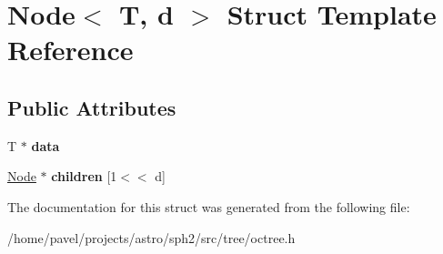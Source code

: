 \hypertarget{structNode}{}\section{Node$<$ T, d $>$ Struct Template Reference}
\label{structNode}
\subsection*{Public Attributes}
\begin{DoxyCompactItemize}
\item 
\hypertarget{structNode_ac1cae505fa4c2d59779ce2fe9fd61b5d}{}\label{structNode_ac1cae505fa4c2d59779ce2fe9fd61b5d} 
T $\ast$ {\bfseries data}
\item 
\hypertarget{structNode_afe25e038145930b4b579cec9331f140f}{}\label{structNode_afe25e038145930b4b579cec9331f140f} 
\hyperlink{structNode}{Node} $\ast$ {\bfseries children} \mbox{[}1$<$$<$ d\mbox{]}
\end{DoxyCompactItemize}


The documentation for this struct was generated from the following file\+:\begin{DoxyCompactItemize}
\item 
/home/pavel/projects/astro/sph2/src/tree/octree.\+h\end{DoxyCompactItemize}

